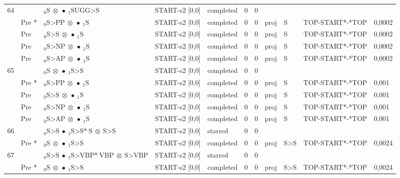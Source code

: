 \documentclass[10pt]{article}
\begin{document}
\begin{longtable}[htbp]{lllllllllll}
64 & & $ {}_0 \textrm{S} \  \otimes \  \bullet \ {}_{1} \textrm{SUGG>S} $ & START-s2 [0,0] & completed & 0 & 0 & & & & \\ 
 & Pre *& $ {}_0 \textrm{S>PP} \  \otimes \  \bullet \ {}_{1} \textrm{S} $ & START-s2 [0,0] & completed & 0 & 0 & proj & S & TOP-START*-*TOP & 0,0002 \\ 
 & Pre & $ {}_0 \textrm{S>S} \  \otimes \  \bullet \ {}_{1} \textrm{S} $ & START-s2 [0,0] & completed & 0 & 0 & proj & S & TOP-START*-*TOP & 0,0002 \\ 
 & Pre & $ {}_0 \textrm{S>NP} \  \otimes \  \bullet \ {}_{1} \textrm{S} $ & START-s2 [0,0] & completed & 0 & 0 & proj & S & TOP-START*-*TOP & 0,0002 \\ 
 & Pre & $ {}_0 \textrm{S>AP} \  \otimes \  \bullet \ {}_{1} \textrm{S} $ & START-s2 [0,0] & completed & 0 & 0 & proj & S & TOP-START*-*TOP & 0,0002 \\ 
65 & & $ {}_0 \textrm{S} \  \otimes \  \bullet \ {}_{1} \textrm{S>S} $ & START-s2 [0,0] & completed & 0 & 0 & & & & \\ 
 & Pre *& $ {}_0 \textrm{S>PP} \  \otimes \  \bullet \ {}_{1} \textrm{S} $ & START-s2 [0,0] & completed & 0 & 0 & proj & S & TOP-START*-*TOP & 0,001 \\ 
 & Pre & $ {}_0 \textrm{S>S} \  \otimes \  \bullet \ {}_{1} \textrm{S} $ & START-s2 [0,0] & completed & 0 & 0 & proj & S & TOP-START*-*TOP & 0,001 \\ 
 & Pre & $ {}_0 \textrm{S>NP} \  \otimes \  \bullet \ {}_{1} \textrm{S} $ & START-s2 [0,0] & completed & 0 & 0 & proj & S & TOP-START*-*TOP & 0,001 \\ 
 & Pre & $ {}_0 \textrm{S>AP} \  \otimes \  \bullet \ {}_{1} \textrm{S} $ & START-s2 [0,0] & completed & 0 & 0 & proj & S & TOP-START*-*TOP & 0,001 \\ 
66 & & $ {}_0 \textrm{S>S} \  \bullet \ {}_{1} \textrm{S>S*} \ \textrm{S} \  \otimes \ \textrm{S>S} $ & START-s2 [0,0] & starred & 0 & 0 & & & & \\ 
 & Pre *& $ {}_0 \textrm{S} \  \otimes \  \bullet \ {}_{1} \textrm{S>S} $ & START-s2 [0,0] & completed & 0 & 0 & proj & S>S & TOP-START*-*TOP & 0,0024 \\ 
67 & & $ {}_0 \textrm{S>S} \  \bullet \ {}_{1} \textrm{S>VBP*} \ \textrm{VBP} \  \otimes \ \textrm{S>VBP} $ & START-s2 [0,0] & starred & 0 & 0 & & & & \\ 
 & Pre *& $ {}_0 \textrm{S} \  \otimes \  \bullet \ {}_{1} \textrm{S>S} $ & START-s2 [0,0] & completed & 0 & 0 & proj & S>S & TOP-START*-*TOP & 0,0024 \\ 

\end{longtable}
\end{document}
